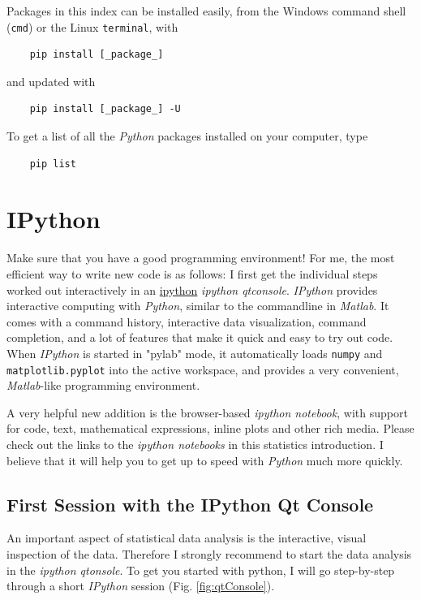 Packages in this index can be installed easily, from the Windows command shell (\lstinline{cmd}) or the Linux \lstinline{terminal}, with

\begin{lstlisting}
    pip install [_package_]
\end{lstlisting}

and updated with

\begin{lstlisting}
    pip install [_package_] -U
\end{lstlisting}

To get a list of all the \emph{Python} packages installed on your computer, type

\begin{lstlisting}
    pip list
\end{lstlisting}


\section{IPython}

Make sure that you have a good programming environment! For me, the most efficient way to write new code is as follows: I first get the individual steps worked out interactively in an \href{http://ipython.org/}{ipython} \emph{ipython qtconsole}. \emph{\Gls{IPython}} provides interactive computing with \emph{Python}, similar to the commandline in \emph{Matlab}. It comes with a command history, interactive data visualization, command completion, and a lot of features that make it quick and easy to try out code. When \emph{IPython} is started in "\gls{pylab}" mode, it automatically loads \lstinline{numpy} and \lstinline{matplotlib.pyplot} into the active workspace, and provides a very convenient, \emph{Matlab}-like programming environment.

A very helpful new addition is the browser-based \emph{ipython notebook}, with support for code, text, mathematical expressions, inline plots and other rich media. Please check out the links to the \emph{ipython
notebooks} in this statistics introduction. I believe that it will  help you to get up to speed with \emph{Python} much more quickly.

\subsection{First Session with the IPython Qt Console}

An important aspect of statistical data analysis is the interactive, visual inspection of the data. Therefore I strongly recommend to start the data analysis in the \emph{ipython qtonsole}. To get you started with python, I will go step-by-step through a short \emph{IPython} session (Fig. \ref{fig:qtConsole}).


